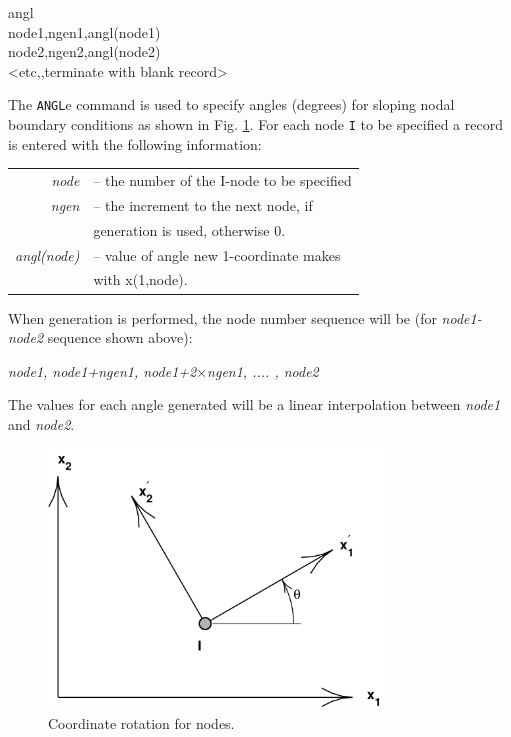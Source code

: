 \hspace{1.0cm} {{ angl                  \hfill}} \\{\smallskip}
\hspace{1.4cm} {{ node1,ngen1,angl(node1) \hfill}} \\{\smallskip}
\hspace{1.4cm} {{ node2,ngen2,angl(node2) \hfill}} \\{\smallskip}
\hspace{1.4cm} {{ <etc,,terminate with blank record> \hfill}}
\headb

The {\tt ANGL}e command is used to specify angles (degrees)
for sloping nodal boundary conditions as shown in Fig. \ref{angf1}.
For each node \texttt{I} to be
specified a record is entered with the following information:

\begin{center}
\begin{tabular}{r l}
\it node       &-- the number of the I-node to be specified \\
\it ngen       &-- the increment to the next node, if \\
               &\quad generation is used, otherwise 0. \\
\it angl(node) &-- value of angle new 1-coordinate makes \\
               & \quad with x(1,node).
\end{tabular}
\end{center}
When generation is performed, the node number sequence
will be (for {\it node1-node2} sequence shown above):

\begin{center}
{\it node1, node1+ngen1, node1+2$\times$ngen1, .... , node2}
\end{center}

\noindent
The values for each angle generated will be a linear interpolation
between {\it node1} and {\it node2}.

\begin{figure}[ht!]
\begin{center}
\includegraphics[width=3.5in]{../lmesh/angcor}
\caption{Coordinate rotation for nodes. \label{angf1} }
\end{center}
\end{figure}

